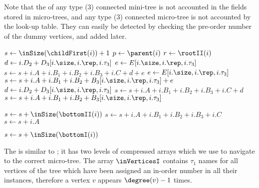Note that the \inSize{} of any type (3) connected mini-tree is not accounted in the fields stored in micro-trees, and any type (3) connected micro-tree is not accounted by the look-up table.
They can easily be detected by checking the pre-order number of the dummy vertices, and added later.

\begin{algorithm}
\begin{algorithmic}
		\State {}
	\Else
		\State $s \gets \inSize(\childFirst(i)) + 1$
			\State $p \gets \parent(i)$
				\State $r \gets \rootII(i)$
				 
					\State $d \gets i.D_2 + D_3[i.\size, i.\rep, i.\tau_3]$%
					\Instr $e \gets E[i.\size, i.\rep, i.\tau_3]$
					\State $s \gets s + i.A + i.B_1 + i.B_2 + i.B_3 + i.C + d + e$
				\Else {}
					\State $e \gets E[i.\size, i.\rep, i.\tau_3]$
					\State $s \gets s + i.A + i.B_1 + i.B_2 + B_3[i.\size, i.\rep, i.\tau_3] + e$
				\EndIf
			 
				\State $d \gets i.D_2 + D_3[i.\size, i.\rep, i.\tau_3]$
				\State $s \gets s + i.A + i.B_1 + i.B_2 + i.B_3 + i.C + d$
			\Else {}
				\State $s \gets s + i.A + i.B_1 + i.B_2 + B_3[i.\size, i.\rep, i.\tau_3]$
			\EndIf
			
					\State $s \gets s + \inSize(\bottomII(i))$ 
				\EndIf
			\EndIf
		 
			\State $s \gets s + i.A + i.B_1 + i.B_2 + i.B_3 + i.C$
		\Else {}
			\State $s \gets s + i.A$
		\EndIf
		
				\State $s \gets s + \inSize(\bottomI(i))$ 
			\EndIf
		\EndIf
	\EndIf
\EndFunction
\end{algorithmic}
\end{algorithm}

\bigbreak

The \inSelect{} is similar to \preSelect{}; it has two levels of compressed arrays which we use to navigate to the correct micro-tree.
The array $\inVerticesI$ contains $\tau_1$ names for all vertices of the tree which have been assigned an in-order number in all their instances, therefore a vertex $v$ appears $\degree(v) - 1$ times.

